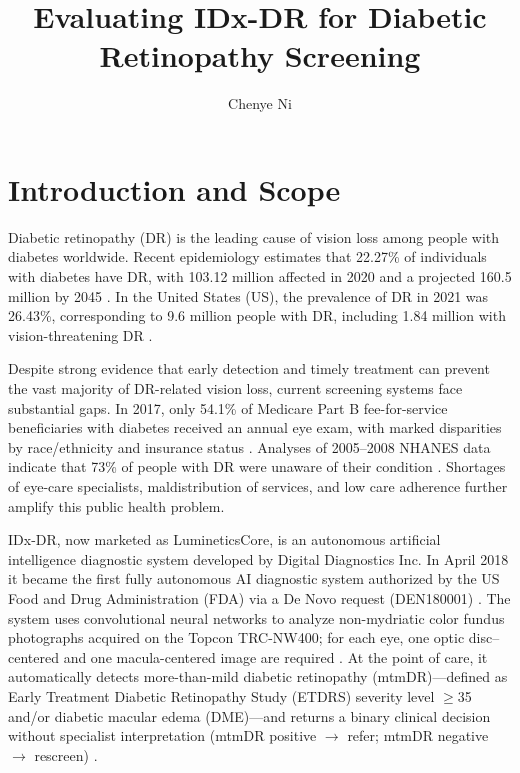 \documentclass[sigconf]{acmart}
\begin{document}
\title{Evaluating IDx-DR for Diabetic Retinopathy Screening}

\author{Chenye Ni}


\maketitle

\section{Introduction and Scope}

Diabetic retinopathy (DR) is the leading cause of vision loss among people with diabetes worldwide. Recent epidemiology estimates that 22.27\% of individuals with diabetes have DR, with 103.12 million affected in 2020 and a projected 160.5 million by 2045 \citep{Teo2021Ophthalmology}. In the United States (US), the prevalence of DR in 2021 was 26.43\%, corresponding to 9.6 million people with DR, including 1.84 million with vision-threatening DR \citep{Lundeen2023JAMAOph}.

Despite strong evidence that early detection and timely treatment can prevent the vast majority of DR-related vision loss, current screening systems face substantial gaps. In 2017, only 54.1\% of Medicare Part B fee-for-service beneficiaries with diabetes received an annual eye exam, with marked disparities by race/ethnicity and insurance status \citep{Lundeen2019MMWR}. Analyses of 2005–2008 NHANES data indicate that 73\% of people with DR were unaware of their condition \citep{Gibson2012AJPM}. Shortages of eye-care specialists, maldistribution of services, and low care adherence further amplify this public health problem.

IDx-DR, now marketed as LumineticsCore, is an autonomous artificial intelligence diagnostic system developed by Digital Diagnostics Inc. In April 2018 it became the first fully autonomous AI diagnostic system authorized by the US Food and Drug Administration (FDA) via a De Novo request (DEN180001) \citep{FDA2018DEN180001}. The system uses convolutional neural networks to analyze non-mydriatic color fundus photographs acquired on the Topcon TRC-NW400; for each eye, one optic disc–centered and one macula-centered image are required \citep{FDA2018DEN180001}. At the point of care, it automatically detects more-than-mild diabetic retinopathy (mtmDR)—defined as Early Treatment Diabetic Retinopathy Study (ETDRS) severity level $\geq$35 and/or diabetic macular edema (DME)—and returns a binary clinical decision without specialist interpretation (mtmDR positive $\rightarrow$ refer; mtmDR negative $\rightarrow$ rescreen) \citep{Abramoff2018Pivotal,FDA2018DEN180001}.
\end{document}
